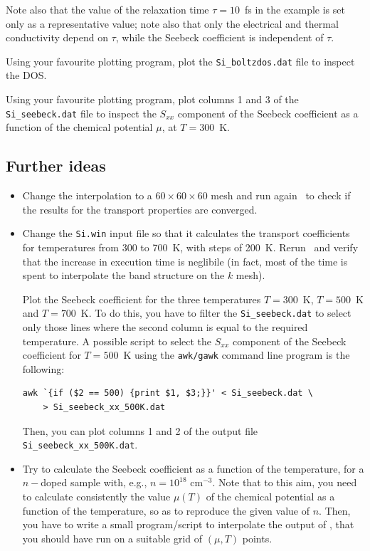 \documentclass[a4paper,11pt,twoside]{article}
\begin{document}
Note also that the value of the relaxation time $\tau=10$~fs in the
example is set only as a representative
value; note also that only the electrical and thermal conductivity
depend on $\tau$, while the Seebeck coefficient is independent of
$\tau$.

Using your favourite plotting program, plot the {\tt Si\_boltzdos.dat} file to inspect the DOS.

Using your favourite plotting program, plot columns 1 and 3 of the {\tt Si\_seebeck.dat} file to inspect the $S_{xx}$ component of the Seebeck coefficient as a function of the chemical potential $\mu$, at $T=300$~K.

\subsection*{Further ideas}

\begin{itemize}
\item Change the interpolation to a $60\times 60\times 60$ mesh and run again \postw\ to check if the results for the transport properties are converged. 

\item Change the {\tt Si.win} input file so that it calculates the transport coefficients for temperatures from 300 to 700~K, with steps of 200~K. Rerun \postw\ and verify that the increase in execution time is neglibile (in fact, most of the time is spent to interpolate the band structure on the $k$ mesh).

Plot the Seebeck coefficient for the three temperatures $T=300$~K, $T=500$~K and $T=700$~K. To do this, you have to filter the {\tt Si\_seebeck.dat} to select only those lines where the second column is equal to the required temperature. A possible script to select the $S_{xx}$ component of the Seebeck coefficient for $T=500$~K using the {\tt awk/gawk} command line program is the following:
\begin{verbatim}
awk `{if ($2 == 500) {print $1, $3;}}' < Si_seebeck.dat \
    > Si_seebeck_xx_500K.dat
\end{verbatim}
Then, you can plot columns 1 and 2 of the output file \verb#Si_seebeck_xx_500K.dat#.
\item Try to calculate the Seebeck coefficient as a function of the temperature, for a $n-$doped sample with, e.g., $n=10^{18}$ cm$^{-3}$. Note that to this aim, you need to calculate consistently the value $\mu(T)$ of the chemical potential as a function of the temperature, so as to reproduce the given value of $n$. Then, you have to write a small program/script to interpolate the output of \bw, that you should have run on a suitable grid of $(\mu,T)$ points.
\end{itemize}
\end{document}

